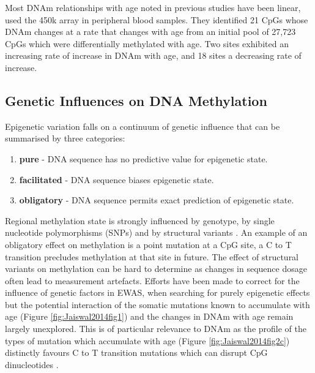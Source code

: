 \documentclass[
]{book}
\begin{document}
Most DNAm relationships with age noted in previous studies have been linear, \citet{Johnson2017} used the 450k array in peripheral blood samples. They identified 21 CpGs whose DNAm changes at a rate that changes with age from an initial pool of 27,723 CpGs which were differentially methylated with age. Two sites exhibited an increasing rate of increase in DNAm with age, and 18 sites a decreasing rate of increase.

\hypertarget{genetic-influences-on-dna-methylation}{%
\subsection{Genetic Influences on DNA Methylation}\label{genetic-influences-on-dna-methylation}}

Epigenetic variation falls on a continuum of genetic influence that can be summarised by three categories:

\begin{enumerate}
\def\labelenumi{\arabic{enumi}.}
\item
  \textbf{pure} - DNA sequence has no predictive value for epigenetic state.
\item
  \textbf{facilitated} - DNA sequence biases epigenetic state.
\item
  \textbf{obligatory} - DNA sequence permits exact prediction of epigenetic state.
\end{enumerate}

Regional methylation state is strongly influenced by genotype, by single nucleotide polymorphisms (SNPs) \citep{Smith2014a} and by structural variants \citep{Bell2017a}. An example of an obligatory effect on methylation is a point mutation at a CpG site, a C to T transition precludes methylation at that site in future. The effect of structural variants on methylation can be hard to determine as changes in sequence dosage often lead to measurement artefacts. Efforts have been made to correct for the influence of genetic factors in EWAS, when searching for purely epigenetic effects but the potential interaction of the somatic mutations known to accumulate with age (Figure \ref{fig:Jaiswal2014fig1}) and the changes in DNAm with age remain largely unexplored. This is of particular relevance to DNAm as the profile of the types of mutation which accumulate with age (Figure \ref{fig:Jaiswal2014fig2c}) distinctly favours C to T transition mutations which can disrupt CpG dinucleotides \citep{Jaiswal2014c}.
\end{document}
